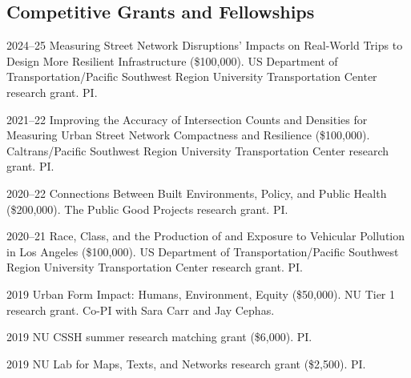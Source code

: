 \documentclass[11pt,letterpaper]{report}
\begin{document}
    \subsection*{Competitive Grants and Fellowships}

    \begin{tablist}

        \item[2024--25] \tab{}Measuring Street Network Disruptions' Impacts on Real-World Trips to Design More Resilient Infrastructure (\$100,000). US Department of Transportation/Pacific Southwest Region University Transportation Center research grant. PI.\@

        \item[2021--22] \tab{}Improving the Accuracy of Intersection Counts and Densities for Measuring Urban Street Network Compactness and Resilience (\$100,000). Caltrans/Pacific Southwest Region University Transportation Center research grant. PI.\@

        \item[2020--22] \tab{}Connections Between Built Environments, Policy, and Public Health (\$200,000). The Public Good Projects research grant. PI.\@

        \item[2020--21] \tab{}Race, Class, and the Production of and Exposure to Vehicular Pollution in Los Angeles (\$100,000). US Department of Transportation/Pacific Southwest Region University Transportation Center research grant. PI.\@

        \item[2019] \tab{}Urban Form Impact: Humans, Environment, Equity (\$50,000). NU Tier 1 research grant. Co-PI with Sara Carr and Jay Cephas.

        \item[2019] \tab{}NU CSSH summer research matching grant (\$6,000). PI.\@

        \item[2019] \tab{}NU Lab for Maps, Texts, and Networks research grant (\$2,500). PI.\@





\end{tablist}
\end{document}
